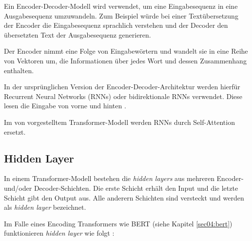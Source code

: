 Ein Encoder-Decoder-Modell wird verwendet, um eine Eingabesequenz in eine Ausgabesequenz umzuwandeln. 
Zum Beispiel würde bei einer Textübersetzung der Encoder die Eingabesequenz sprachlich verstehen und der Decoder den übersetzten Text der Ausgabesequenz generieren.

Der Encoder nimmt eine Folge von Eingabewörtern und wandelt sie in eine Reihe von Vektoren um, die Informationen über jedes Wort und dessen Zusammenhang enthalten.

In der ursprünglichen Version der Encoder-Decoder-Architektur werden hierfür Recurrent Neural Networks (RNNs) oder bidirektionale RNNs verwendet.
Diese lesen die Eingabe von vorne und hinten \cite{bahdanau2016neuralmachinetranslationjointly}.

Im von \cite{vaswani2023attentionneed} vorgestelltem Transformer-Modell werden RNNs durch Self-Attention ersetzt. 


\subsection{Hidden Layer} \label{sec:hidden_layer}

In einem Transformer-Modell \cite{vaswani2023attentionneed} bestehen die \textit{hidden layers} aus mehreren Encoder- und/oder Decoder-Schichten.
Die erste Schicht erhält den Input und die letzte Schicht gibt den Output aus. Alle anderern Schichten sind versteckt und werden
als \textit{hidden layer} bezeichnet.

Im Falle eines Encoding Transformers wie BERT (siehe Kapitel \ref{sec04:bert}) funktionieren \textit{hidden layer} wie folgt \cite{DBLP:journals/corr/abs-1810-04805}:

